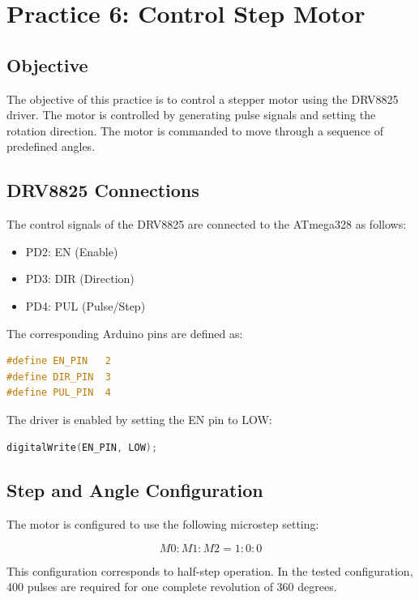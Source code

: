 \documentclass[12pt,a4paper]{article}
\begin{document}
\section{Practice 6: Control Step Motor}

\subsection{Objective}

The objective of this practice is to control a stepper motor using the
DRV8825 driver. The motor is controlled by generating pulse signals and
setting the rotation direction. The motor is commanded to move through
a sequence of predefined angles.

\subsection{DRV8825 Connections}

The control signals of the DRV8825 are connected to the ATmega328 as
follows:

\begin{itemize}
    \item PD2: EN (Enable)
    \item PD3: DIR (Direction)
    \item PD4: PUL (Pulse/Step)
\end{itemize}

The corresponding Arduino pins are defined as:

\begin{lstlisting}[language=C]
#define EN_PIN   2
#define DIR_PIN  3
#define PUL_PIN  4
\end{lstlisting}

The driver is enabled by setting the EN pin to LOW:

\begin{lstlisting}[language=C]
digitalWrite(EN_PIN, LOW);
\end{lstlisting}

\subsection{Step and Angle Configuration}

The motor is configured to use the following microstep setting:

\[
M0:M1:M2 = 1:0:0
\]

This configuration corresponds to half-step operation. In the tested
configuration, 400 pulses are required for one complete revolution of
360 degrees.
\end{document}
